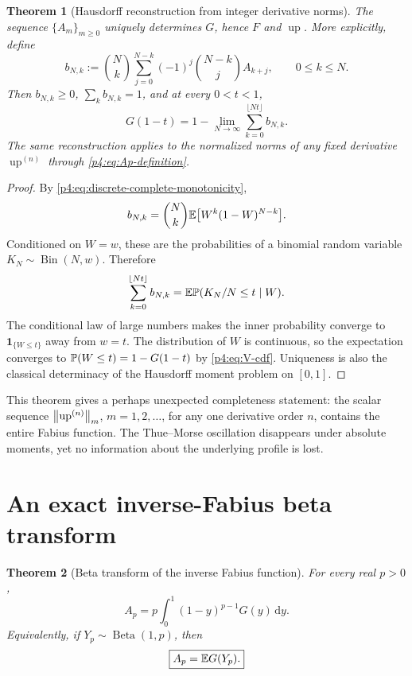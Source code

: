 \documentclass[11pt,oneside]{article}
\newtheorem{theorem}{Theorem}[section]
\theoremstyle{definition}
\theoremstyle{remark}
\newcommand{\Up}{\operatorname{up}}
\newcommand{\dd}{\,\mathrm d}
\begin{document}
\begin{theorem}[Hausdorff reconstruction from integer derivative norms]
\label{p4:thm:hausdorff-reconstruction}
The sequence $\{A_m\}_{m\geq0}$ uniquely determines $G$, hence $F$ and $\Up$.
More explicitly, define
\begin{equation}
 b_{N,k}:=\binom Nk
 \sum_{j=0}^{N-k}(-1)^j\binom{N-k}{j}A_{k+j},
 \qquad0\leq k\leq N.
 \label{p4:eq:bernstein-masses}
\end{equation}
Then $b_{N,k}\geq0$, $\sum_kb_{N,k}=1$, and at every $0<t<1$,
\begin{equation}
 \boxed{
 G(1-t)=1-\lim_{N\to\infty}
 \sum_{k=0}^{\lfloor Nt\rfloor}b_{N,k}.}
 \label{p4:eq:G-from-norms}
\end{equation}
The same reconstruction applies to the normalized norms of any fixed derivative
$\Up^{(n)}$ through \eqref{p4:eq:Ap-definition}.
\end{theorem}

\begin{proof}
By \eqref{p4:eq:discrete-complete-monotonicity},
\[
 b_{N,k}=\binom Nk\mathbb E\bigl[W^k(1-W)^{N-k}\bigr].
\]
Conditioned on $W=w$, these are the probabilities of a binomial random variable
$K_N\sim\operatorname{Bin}(N,w)$.  Therefore
\[
 \sum_{k=0}^{\lfloor Nt\rfloor}b_{N,k}
 =\mathbb E\mathbb P(K_N/N\leq t\mid W).
\]
The conditional law of large numbers makes the inner probability converge to
$\mathbf1_{\{W\leq t\}}$ away from $w=t$.  The distribution of $W$ is continuous, so the
expectation converges to $\mathbb P(W\leq t)=1-G(1-t)$ by
\eqref{p4:eq:V-cdf}.  Uniqueness is also the classical determinacy of the Hausdorff moment
problem on $[0,1]$.
\end{proof}

\begin{remark}
This theorem gives a perhaps unexpected completeness statement: the scalar sequence
$\norm{\Up^{(n)}}_m$, $m=1,2,\ldots$, for any one derivative order $n$, contains the entire
Fabius function.  The Thue--Morse oscillation disappears under absolute moments, yet no
information about the underlying profile is lost.
\end{remark}

\section{An exact inverse-Fabius beta transform}
\label{p4:sec:beta-transform}

\begin{theorem}[Beta transform of the inverse Fabius function]
\label{p4:thm:beta-transform}
For every real $p>0$,
\begin{equation}
 \boxed{
 A_p=p\int_0^1(1-y)^{p-1}G(y)\dd y.}
 \label{p4:eq:beta-transform}
\end{equation}
Equivalently, if $Y_p\sim\operatorname{Beta}(1,p)$, then
\begin{equation}
 \boxed{A_p=\mathbb E G(Y_p).}
 \label{p4:eq:beta-expectation}
\end{equation}
\end{theorem}
\end{document}

